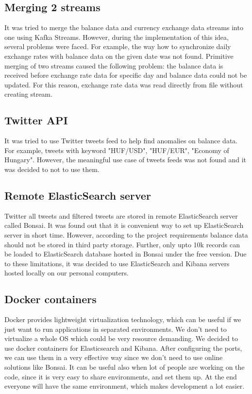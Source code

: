 \documentclass{article}
\begin{document}
\subsection{Merging 2 streams}

It was tried to merge the balance data and currency exchange data streams into one using Kafka Streams. However, during the implementation of this idea, several problems were faced. For example, the way how to synchronize daily exchange rates with balance data on the given date was not found. Primitive merging of two streams caused the following problem: the balance data is received before exchange rate data for specific day and balance data could not be updated. For this reason, exchange rate data was read directly from file without creating stream.

\subsection{Twitter API}

It was tried to use Twitter tweets feed to help find anomalies on balance data. For example, tweets with keyword "HUF/USD", "HUF/EUR", "Economy of Hungary". However, the meaningful use case of tweets feeds was not found and it was decided to not to use them.

\subsection{Remote ElasticSearch server}

Twitter all tweets and filtered tweets are stored in remote ElasticSearch server called Bonsai. It was found out that it is convenient way to set up ElasticSearch server in short time. However, according to the project requirements balance data should not be stored in third party storage. Further, only upto 10k records can be loaded to ElasticSearch database hosted in Bonsai under the free version. Due to these limitations, it was decided to use ElasticSearch and Kibana servers hosted locally on our personal computers.

\subsection{Docker containers}

Docker provides lightweight virtualization technology, which can be useful if we just want to run applications in separated environments. We don't need to virtualize a whole OS which could be very resource demanding. We decided to use docker containers for Elasticsearch and Kibana. After configuring the ports, we can use them in a very effective way since we don't need to use online solutions like Bonsai. It can be useful also when lot of people are working on the code, since it is very easy to share environments, and set them up. At the end everyone will have the same environment, which makes development a lot easier.
\end{document}
